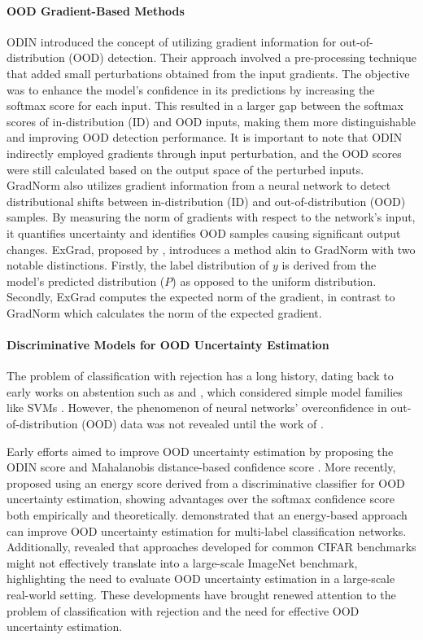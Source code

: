 \documentclass{article}
\begin{document}
\paragraph{OOD Gradient-Based Methods}
ODIN \cite{liang2018enhancing} introduced the concept of utilizing gradient information for out-of-distribution (OOD) detection. Their approach involved a pre-processing technique that added small perturbations obtained from the input gradients. The objective was to enhance the model's confidence in its predictions by increasing the softmax score for each input. This resulted in a larger gap between the softmax scores of in-distribution (ID) and OOD inputs, making them more distinguishable and improving OOD detection performance. It is important to note that ODIN indirectly employed gradients through input perturbation, and the OOD scores were still calculated based on the output space of the perturbed inputs.
GradNorm \cite{huang2021importance} also utilizes gradient information from a neural network to detect distributional shifts between in-distribution (ID) and out-of-distribution (OOD) samples. By measuring the norm of gradients with respect to the network's input, it quantifies uncertainty and identifies OOD samples causing significant output changes. 
ExGrad, proposed by \cite{igoe2022useful}, introduces a method akin to GradNorm with two notable distinctions. Firstly, the label distribution of $y$ is derived from the model's predicted distribution ($P$) as opposed to the uniform distribution. Secondly, ExGrad computes the expected norm of the gradient, in contrast to GradNorm which calculates the norm of the expected gradient.

\paragraph{Discriminative Models for OOD Uncertainty Estimation} 
The problem of classification with rejection has a long history, dating back to early works on abstention such as \cite{chow1970optimum} and \cite{fumera2002support}, which considered simple model families like SVMs \cite{cortes1995support}. However, the phenomenon of neural networks' overconfidence in out-of-distribution (OOD) data was not revealed until the work of \cite{nguyen2015deep}.

Early efforts aimed to improve OOD uncertainty estimation by proposing the ODIN score \cite{ liang2018enhancing} and Mahalanobis distance-based confidence score \cite{lee2018simple}. More recently, \cite{liu2020energy} proposed using an energy score derived from a discriminative classifier for OOD uncertainty estimation, showing advantages over the softmax confidence score both empirically and theoretically. \cite{wang2021canmulti} demonstrated that an energy-based approach can improve OOD uncertainty estimation for multi-label classification networks.
Additionally, \cite{huang2021mos} revealed that approaches developed for common CIFAR benchmarks might not effectively translate into a large-scale ImageNet benchmark, highlighting the need to evaluate OOD uncertainty estimation in a large-scale real-world setting. These developments have brought renewed attention to the problem of classification with rejection and the need for effective OOD uncertainty estimation.
\end{document}
